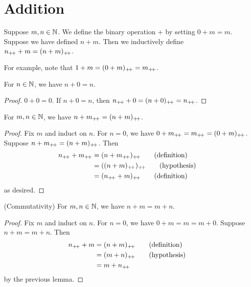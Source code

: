 
\section{Addition} \label{sec:N:addition}

\begin{definition*}[Addition] \label{def:N:addition}
    Suppose $m, n \in \mathbb{N}$.
    We define the binary operation $+$ by setting $0 + m = m$.
    Suppose we have defined $n + m$.
    Then we inductively define $n_{+\!+} + m = (n + m)_{+\!+}$.
\end{definition*}
For example, note that $1 + m = (0 + m)_{+\!+} = m_{+\!+}$.

\begin{lemma} \label{thm:N:add_zero}
    For $n \in \mathbb{N}$, we have $n + 0 = n$.
\end{lemma}
\begin{proof}
    $0 + 0 = 0$.
    If $n + 0 = n$, then $n_{+\!+} + 0 = (n + 0)_{+\!+} = n_{+\!+}$.
\end{proof}

\begin{lemma} \label{thm:N:add_successor}
    For $m, n \in \mathbb{N}$, we have $n + m_{+\!+} = (n + m)_{+\!+}$.
\end{lemma}
\begin{proof}
    Fix $m$ and induct on $n$.
    For $n = 0$, we have $0 + m_{+\!+} = m_{+\!+} = (0 + m)_{+\!+}$.
    Suppose $n + m_{+\!+} = (n + m)_{+\!+}$.
    Then \begin{align*}
        n\pp + m\pp &= (n + m\pp)\pp \tag{definition} \\
                    &= ((n + m)\pp)\pp \tag{hypothesis} \\
                    &= (n\pp + m)\pp \tag{definition}
    \end{align*}
    as desired.
\end{proof}

\begin{exercise} \label{prb:N:add_commute}
    (Commutativity) For $m, n \in \mathbb{N}$, we have $n + m = m + n$.
\end{exercise}
\begin{proof}
    Fix $m$ and induct on $n$.
    For $n = 0$, we have $0 + m = m = m + 0$.
    Suppose $n + m = m + n$.
    Then \begin{align*}
        n_{+\!+} + m &= (n + m)_{+\!+} \tag{definition} \\
                 &= (m + n)_{+\!+} \tag{hypothesis} \\
                 &= m + n_{+\!+}
    \end{align*}
    by the previous lemma.
\end{proof}

